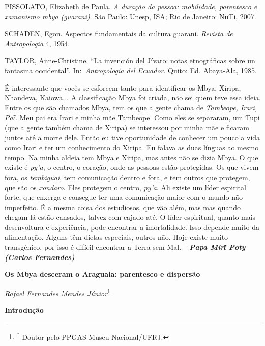 PISSOLATO, Elizabeth de Paula. \emph{A duração da pessoa: mobilidade,
parentesco e xamanismo mbya (guarani)}. São Paulo: Unesp, ISA; Rio de
Janeiro: NuTi, 2007.

SCHADEN, Egon. Aspectos fundamentais da cultura guarani. \emph{Revista
de Antropologia} 4, 1954.

TAYLOR, Anne-Christine. ``La invención del Jívaro: notas etnográficas
sobre un fantasma occidental''. In:~\emph{Antropología del Ecuador}.
Quito: Ed. Abaya-Ala, 1985.

É interessante que vocês se esforcem tanto para identificar os Mbya,
Xiripa, Nhandeva, Kaiowa... A classificação Mbya foi criada, não sei
quem teve essa ideia. Entre os que são chamados Mbya, tem os que a gente
chama de \emph{Tambeope, Irari, Paῖ.} Meu pai era Irari e minha mãe
Tambeope. Como eles se separaram, um Tupi (que a gente também chama de
Xiripa) se interessou por minha mãe e ficaram juntos até a morte dele.
Então eu tive oportunidade de conhecer um pouco a vida como Irari e ter
um conhecimento do Xiripa. Eu falava as duas línguas ao mesmo tempo. Na
minha aldeia tem Mbya e Xiripa, mas antes não se dizia Mbya. O que
existe é \emph{py'a}, o centro, o coração, onde as pessoas estão
protegidas. Os que vivem fora, os \emph{tembiguai}, tem comunicação
dentro e fora, e tem outros que protegem, que são os \emph{xondaro}.
Eles protegem o centro, \emph{py'a}. Ali existe um líder espirital
forte, que enxerga e consegue ter uma comunicação maior com o mundo não
imperfeito. É a mesma coisa dos estudiosos, que vão além, mas mas quando
chegam lá estão cansados, talvez com cajado até. O líder espiritual,
quanto mais desenvoltura e experiência, pode encontrar a imortalidade.
Isso depende muito da alimentação. Alguns têm dietas especiais, outros
não. Hoje existe muito transgênico, por isso é difícil encontrar a Terra
sem Mal. -- \emph{\textbf{Papa Mirῖ Poty (Carlos Fernandes) }}

\textbf{Os Mbya desceram o Araguaia: parentesco e dispersão}

\emph{Rafael Fernandes Mendes Júnior}\footnote{\textsuperscript{*}
  Doutor pelo PPGAS-Museu Nacional/UFRJ.}

\textbf{Introdução}

